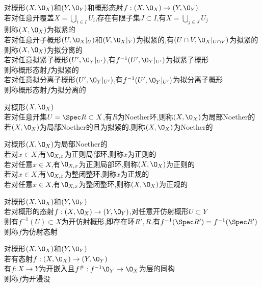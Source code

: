 \begin{dingyi}
对概形$(X,\O_{X})$和$(Y,\O_{Y})$和概形态射$f:(X,\O_{X})\to (Y,\O_{Y})$\\
若对任意开覆盖$X=\bigcup\limits_{i\in I}U_i$,存在有限子集$J\subset I$,有$X=\bigcup\limits_{j\in J} U_j$\\
则称$(X,\O_{X})$为拟紧的\\
若对任意开子概形$(U,\O_{X}|_{U})$和$(V,\O_{X}|_{V})$为拟紧的,有$(U\cap V,\O_{X}|_{U\cap V})$为拟紧的\\
则称$(X,\O_{X})$为拟分离的\\
若对任意拟紧子概形$(U',\O_{Y}|_{U'})$,有$f^{-1}(U',\O_{Y}|_{U'})$为拟紧子概形\\
则称概形态射$f$为拟紧的\\
若对任意拟分离子概形$(U',\O_{Y}|_{U'})$,有$f^{-1}(U',\O_{Y}|_{U'})$为拟分离子概形\\
则称概形态射$f$为拟分离的
\end{dingyi}

\begin{dingyi}
对概形$(X,\O_{X})$\\
若对任意开集$U=\Spec R\subset X$,有$R$为Noether环,则称$(X,\O_{X})$为局部Noether的\\
若$(X,\O_{X})$为局部Noether的且为拟紧的,则称$(X,\O_{X})$为Noether的
\end{dingyi}

\begin{dingyi}
对概形$(X,\O_{X})$为局部Noether的\\
若对$x\in X$,有$\O_{X,x}$为正则局部环,则称$x$为正则的\\
若对任意$x\in X$,有$\O_{X,x}$为正则局部环,则称$(X,\O_{X})$为正则的\\
若对$x\in X$,有$\O_{X,x}$为整闭整环,则称$x$为正规的\\
若对任意$x\in X$,有$\O_{X,x}$为整闭整环,则称$(X,\O_{X})$为正规的
\end{dingyi}

\begin{dingyi}
对概形$(X,\O_{X})$和$(Y,\O_{Y})$\\
若对概形的态射$f:(X,\O_{X})\to (Y,\O_{Y})$,对任意开仿射概形$U\subset Y$\\
则有$f^{-1}(U)\subset X$为开仿射概形,即存在环$R',R$,有$f^{-1}(\Spec R')=f^{-1}(\Spec R')$\\
则称$f$为仿射态射
\end{dingyi}

\begin{dingyi}
对概形$(X,\O_{X})$和$(Y,\O_{Y})$\\
若有态射$f:(X,\O_{X})\to (Y,\O_{Y})$\\
有$f:X\to Y$为开嵌入且$f^{\#}:f^{-1}\O_{Y}\to \O_{X}$为层的同构\\
则称$f$为开浸没
\end{dingyi}

